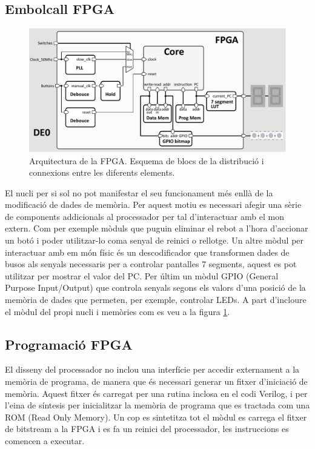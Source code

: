 \documentclass[10pt,a4paper,twocolumn,twoside]{article}
\begin{document}
    \subsection{Embolcall FPGA}
        \begin{figure}[!ht]
    \centering
    	\includegraphics[width=0.9\linewidth]{pdf/arch_FPGA.pdf}
        \caption{Arquitectura de la FPGA. Esquema de blocs de la distribució i connexions entre les diferents elements.}
        \label{fig:FPGA_arch}
    \end{figure}
    
    El nucli per si sol no pot manifestar el seu funcionament més enllà de la modificació de dades de memòria. Per aquest motiu es necessari afegir una sèrie de components addicionals al processador per tal d’interactuar amb el mon extern. 
    Com per exemple mòduls que puguin eliminar el rebot a l'hora d'accionar un botó i poder utilitzar-lo coma senyal de reinici o rellotge. Un altre mòdul per interactuar amb em món físic és un
    descodificador que transformen dades de busos als senyals necessaris per a controlar pantalles 7 segments, aquest es pot utilitzar per mostrar el valor del PC. Per últim un mòdul GPIO (General Purpose Input/Output) que controla senyals segons els valors d'una posició de la memòria de dades que permeten, per exemple, controlar LEDs. A part d'incloure el mòdul del propi nucli i memòries com es veu a la figura \ref{fig:FPGA_arch}.

    
    \subsection{Programació FPGA}
    El disseny del processador no inclou una interfície per accedir externament a la memòria de programa, de manera que és necessari generar un fitxer d'iniciació de memòria. Aquest fitxer és carregat per una rutina inclosa en el codi Verilog, i per l’eina de síntesis per inicialitzar la memòria de programa que es tractada com una ROM (Read Only Memory). Un cop es sintetitza tot el mòdul es carrega el fitxer de bitstream a la FPGA i es fa un reinici del processador, les instruccions es comencen a executar. 
    
\end{document}
